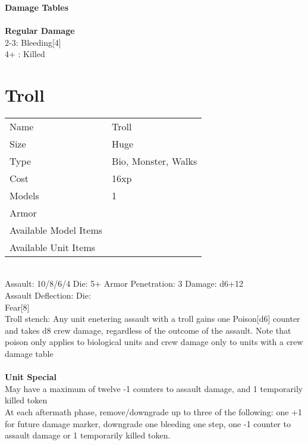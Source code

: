 \ \\ {\bf  } \\
 \\



{\bf Damage Tables} \\
\ \\ {\bf Regular Damage } \\
2-3: Bleeding[4] \\
4+ : Killed \\









\pagebreak

\section{ Troll }

\begin{tabular}{ll}
  Name & Troll \\
  Size & Huge\\
  Type & Bio, Monster, Walks\\
  Cost & 16xp\\
  Models & 1\\
  Armor & \\
  Available Model Items &  \\
  Available Unit Items &  \\
\end{tabular}

\ \\
Assault: 10/8/6/4 Die: 5+ Armor Penetration: 3 Damage: d6+12 \\
Assault Deflection:  Die: \\
\indent Fear[8]\\ Troll stench: Any unit enetering assault with a troll gains one Poison[d6] counter and takes d8 crew damage, regardless of the outcome of the assault. Note that poison only applies to biological units and crew damage only to units with a crew damage table \\
\ \\

{\bf Unit Special} \\
May have a maximum of twelve -1 counters to assault damage, and 1 temporarily killed token\\ At each aftermath phase, remove/downgrade up to three of the following: one +1 for future damage marker, downgrade one bleeding one step, one -1 counter to assault damage or 1 temporarily killed token.\\
\ \\


